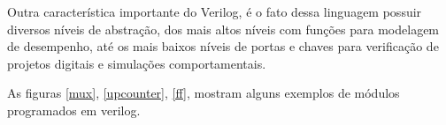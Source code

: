 Outra característica importante do Verilog, é o fato dessa linguagem possuir diversos níveis de abstração, dos mais altos níveis com funções para modelagem de desempenho, até os mais baixos níveis de portas e chaves para verificação de projetos digitais e simulações comportamentais.



As figuras \ref{mux}, \ref{upcounter}, \ref{ff}, mostram alguns exemplos de módulos programados em verilog.

